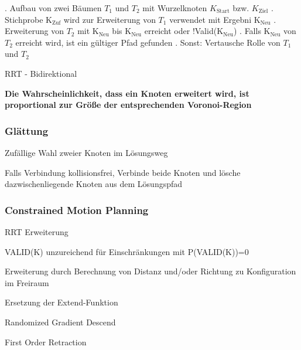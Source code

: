 \begin{algorithm}[H]
    \begin{algorithmic}
        . Aufbau von zwei Bäumen $T_1$ und $T_2$ mit Wurzelknoten $K_\text{Start}$ bzw. $K_\text{Ziel}$
        . Stichprobe K$_\text{Zuf}$ wird zur Erweiterung von $T_1$ verwendet mit Ergebni K$_\text{Neu}$
        . Erweiterung von $T_2$ mit K$_\text{Neu}$ bis K$_\text{Neu}$ erreicht oder !Valid(K$_\text{Neu}$)
        . Falls K$_\text{Neu}$ von $T_2$ erreicht wird, ist ein gültiger Pfad gefunden
        . Sonst: Vertausche Rolle von $T_1$ und $T_2$

        \caption{RRT - Bidirektional}
    \end{algorithmic}
\end{algorithm}

\textbf{Die Wahrscheinlichkeit, dass ein Knoten erweitert wird, ist proportional zur Größe der
entsprechenden Voronoi-Region}

\subsubsection{Glättung}
\begin{compactitem}
    \item Zufällige Wahl zweier Knoten im Lösungsweg
    \item Falls Verbindung kollisionsfrei, Verbinde beide Knoten und lösche dazwischenliegende Knoten
    aus dem Lösungspfad
\end{compactitem}

\subsubsection{Constrained Motion Planning}
\begin{compactitem}
    \item RRT Erweiterung
    \item VALID(K) unzureichend für Einschränkungen mit P(VALID(K))=0
    \item Erweiterung durch Berechnung von Distanz und/oder Richtung zu Konfiguration im Freiraum
    \item Ersetzung der Extend-Funktion
    \begin{compactitem}
        \item Randomized Gradient Descend
        \item First Order Retraction
    \end{compactitem}
\end{compactitem}

